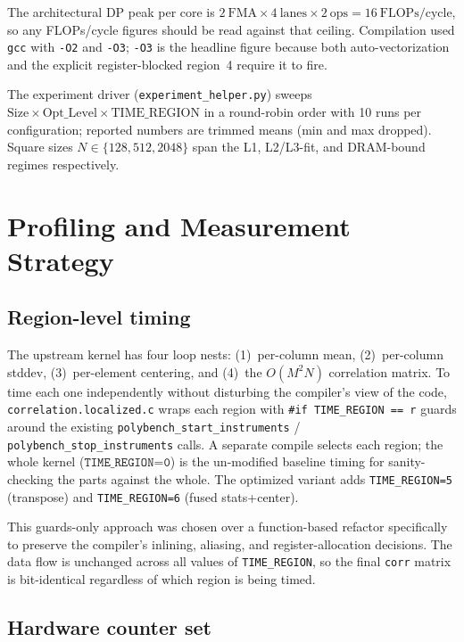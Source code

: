 \documentclass[11pt]{article}
\begin{document}
The architectural DP peak per core is $2~\text{FMA} \times 4~\text{lanes} \times 2~\text{ops} = 16~\text{FLOPs/cycle}$, so any FLOPs/cycle figures should be read against that ceiling. Compilation used \texttt{gcc} with \texttt{-O2} and \texttt{-O3}; \texttt{-O3} is the headline figure because both auto-vectorization and the explicit register-blocked region~4 require it to fire.

The experiment driver (\texttt{experiment\_helper.py}) sweeps $\text{Size} \times \text{Opt\_Level} \times \text{TIME\_REGION}$ in a round-robin order with 10 runs per configuration; reported numbers are trimmed means (min and max dropped). Square sizes $N \in \{128, 512, 2048\}$ span the L1, L2/L3-fit, and DRAM-bound regimes respectively.


\section{Profiling and Measurement Strategy}

\subsection{Region-level timing}

The upstream kernel has four loop nests: (1)~per-column mean, (2)~per-column stddev, (3)~per-element centering, and (4)~the $O(M^2 N)$ correlation matrix. To time each one independently without disturbing the compiler's view of the code, \texttt{correlation.localized.c} wraps each region with \texttt{\#if TIME\_REGION == r} guards around the existing \texttt{polybench\_start\_instruments} / \texttt{polybench\_stop\_instruments} calls. A separate compile selects each region; the whole kernel ($\texttt{TIME\_REGION=0}$) is the un-modified baseline timing for sanity-checking the parts against the whole. The optimized variant adds \texttt{TIME\_REGION=5} (transpose) and \texttt{TIME\_REGION=6} (fused stats+center).

This guards-only approach was chosen over a function-based refactor specifically to preserve the compiler's inlining, aliasing, and register-allocation decisions. The data flow is unchanged across all values of \texttt{TIME\_REGION}, so the final \texttt{corr} matrix is bit-identical regardless of which region is being timed.

\subsection{Hardware counter set}
\end{document}
